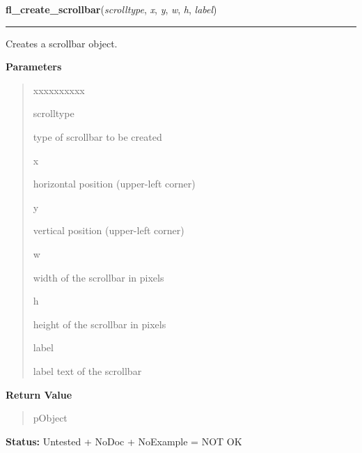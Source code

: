     \label{xformslib:library:fl_create_scrollbar}

    \vspace{0.5ex}

\hspace{.8\funcindent}\begin{boxedminipage}{\funcwidth}

    \raggedright \textbf{fl\_create\_scrollbar}(\textit{scrolltype}, \textit{x}, \textit{y}, \textit{w}, \textit{h}, \textit{label})

    \vspace{-1.5ex}

    \rule{\textwidth}{0.5\fboxrule}
\setlength{\parskip}{2ex}
    Creates a scrollbar object.

\setlength{\parskip}{1ex}
      \textbf{Parameters}
      \vspace{-1ex}

      \begin{quote}
        \begin{Ventry}{xxxxxxxxxx}

          \item[scrolltype]

          type of scrollbar to be created

          \item[x]

          horizontal position (upper-left corner)

          \item[y]

          vertical position (upper-left corner)

          \item[w]

          width of the scrollbar in pixels

          \item[h]

          height of the scrollbar in pixels

          \item[label]

          label text of the scrollbar

        \end{Ventry}

      \end{quote}

      \textbf{Return Value}
    \vspace{-1ex}

      \begin{quote}
      pObject

      \end{quote}

\textbf{Status:} Untested + NoDoc + NoExample = NOT OK



    \end{boxedminipage}

